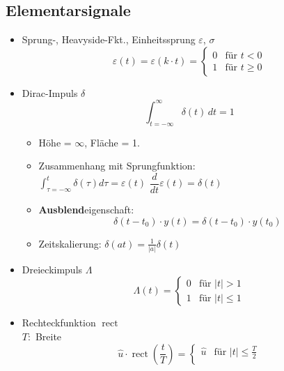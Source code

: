   \subsection{Elementarsignale}
  \begin{mdframed}[style=exercise]
      \begin{itemize}[leftmargin=*]
          \item{Sprung-, Heavyside-Fkt., Einheitssprung $\varepsilon$, $\sigma$}
          \[ \varepsilon(t) = \varepsilon(k\cdot t) = 
             \begin{cases}
                 0 & \text{f\"ur } t < 0\\
                 1 & \text{f\"ur } t \geq 0
             \end{cases}
          \]
          \item{Dirac-Impuls $\delta$}
          \[
              \int_{t=-\infty}^{\infty} \delta(t) \, dt = 1
          \]
          \begin{itemize}
              \item Höhe = $\infty$, Fläche = 1.
              \item{Zusammenhang mit Sprungfunktion:}\\
                  $\boxed{\int_{\tau=-\infty}^{t}\delta(\tau)d\tau =
                  \varepsilon(t)}$
                  $\boxed{\dfrac{d}{dt}\varepsilon(t) =
                  \delta(t)}$
              \item{\textbf{Ausblend}eigenschaft}:
                  \[
                      \delta(t-t_0)\cdot y(t) = \delta(t-t_0)\cdot y(t_0)
                  \]
              \item{Zeitskalierung: }
                  $\delta(at)=\frac{1}{\lvert a\rvert}\delta(t)$
          \end{itemize}
          \item{Dreieckimpuls $\Lambda$}
          \[ \Lambda(t) =
             \begin{cases}
                 0 & \text{f\"ur } \vert t\rvert > 1\\
                 1 & \text{f\"ur } \vert t\rvert \leq 1
             \end{cases}
          \]
          \item{Rechteckfunktion $\operatorname{rect}$}\\
          $T:$ Breite
          \[ \hat{u} \cdot \operatorname{rect}\left(\frac{t}{T}\right) =
             \begin{cases}
                 \hat{u} & \text{f\"ur } \vert t\rvert \leq \frac{T}{2}\\

\end{cases}\]
\end{itemize}
\end{mdframed}
